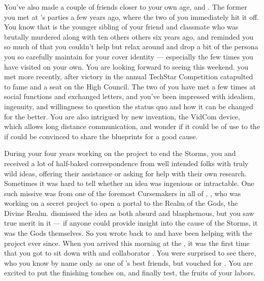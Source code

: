 \documentclass[char]{GL2020}
\begin{document}
You’ve also made a couple of friends closer to your own age, \cHeir{\intro} and \cTechStar{\intro}. The former you met at \cHeir{\their} \cDiplomat{\auncle} \cDiplomat{}’s parties a few years ago, where the two of you immediately hit it off. You know that \cHeir{} is the younger sibling of your friend and classmate \cHeirSibling{\intro} who was brutally murdered along with ten others others six years ago, and \cHeir{\they} reminded you so much of \cHeirSibling{} that you couldn’t help but relax around \cHeir{\them} and drop a bit of the persona you so carefully maintain for your cover identity — especially the few times you have visited \cHeir{\them} on your own. You are looking forward to seeing \cHeir{} this weekend. \cTechStar{} you met more recently, after \cTechStar{\their} victory in the annual TechStar Competition catapulted \cTechStar{\them} to fame and a seat on the High Council. The two of you have met a few times at social functions and exchanged letters, and you’ve been impressed with \cTechStar{\their} idealism, ingenuity, and willingness to question the status quo and how it can be changed for the better. You are also intrigued by \cTechStar{\their} new invention, the VidCom device, which allows long distance communication, and wonder if it could be of use to the \pShip{} if \cTechStar{} could be convinced to share the blueprints for a good cause.

During your four years working on the project to end the Storms, you and \cHeadScientist{} received a lot of half-baked correspondence from well intended folks with truly wild ideas, offering their assistance or asking for help with their own research. Sometimes it was hard to tell whether an idea was ingenious or intractable. One such missive was from one of the foremost Cursemakers in all of \pEarth{}, \cCurse{\intro}, who was working on a secret project to open a portal to the Realm of the Gods, the Divine Realm. \cHeadScientist{} dismissed the idea as both absurd and blasphemous, but you saw true merit in it — if anyone could provide insight into the cause of the Storms, it was the Gods themselves. So you wrote back to \cCurse{} and have been helping with the project ever since. When you arrived this morning at the \pSchool{}, it was the first time that you got to sit down with \cCurse{} and \cCurse{\their} collaborator \cFlowPriest{\intro}. You were surprised to see \cAmbition{\intro} there, who you know by name only as one of \cHeir{}’s best friends, but \cFlowPriest{} vouched for \cAmbition{\them}. You are excited to put the finishing touches on, and finally test, the fruits of your labors.
\end{document}
